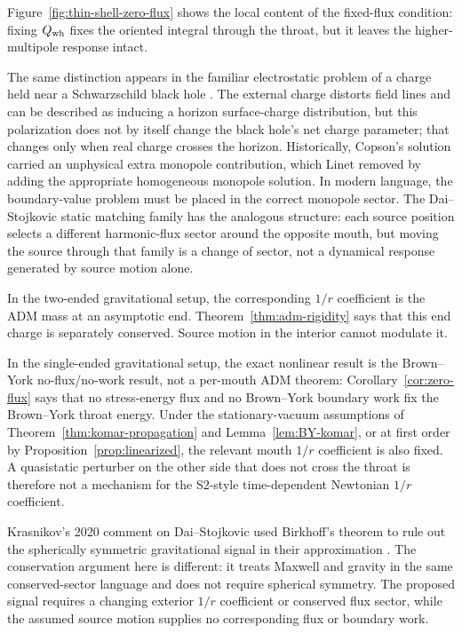 \documentclass[aps,prd,10pt,onecolumn,nofootinbib,superscriptaddress,floatfix]{revtex4-2}
\begin{document}
Figure~\ref{fig:thin-shell-zero-flux} shows the local content of the
fixed-flux condition: fixing $Q_{\rm wh}$ fixes the oriented integral through
the throat, but it leaves the higher-multipole response intact.

The same distinction appears in the familiar electrostatic problem of a charge
held near a Schwarzschild black hole
\cite{Copson1928Electrostatics,HanniRuffini1973Lines,
Linet1976Electrostatics,PoissonPoundVega2011Motion}.  The external charge
distorts field lines and can be described as inducing a horizon surface-charge
distribution, but this polarization does not by itself change the black hole's
net charge parameter; that changes only when real charge crosses the horizon.
Historically, Copson's solution carried an unphysical extra monopole
contribution, which Linet removed by adding the appropriate homogeneous
monopole solution.  In modern language, the boundary-value problem must be
placed in the correct monopole sector.  The Dai--Stojkovic static matching
family has the analogous structure: each source position selects a different
harmonic-flux sector around the opposite mouth, but moving the source through
that family is a change of sector, not a dynamical response generated by source
motion alone.

In the two-ended gravitational setup, the corresponding $1/r$ coefficient is
the ADM mass at an asymptotic end.  Theorem~\ref{thm:adm-rigidity} says that
this end charge is separately conserved.  Source motion in the interior
cannot modulate it.

In the single-ended gravitational setup, the exact nonlinear result is the
Brown--York no-flux/no-work result, not a per-mouth ADM theorem:
Corollary~\ref{cor:zero-flux} says that no stress-energy flux and no
Brown--York boundary work fix the Brown--York throat energy.  Under the
stationary-vacuum assumptions of Theorem~\ref{thm:komar-propagation} and
Lemma~\ref{lem:BY-komar}, or at first order by
Proposition~\ref{prop:linearized}, the relevant mouth $1/r$ coefficient is
also fixed.  A quasistatic perturber on the other side that does not cross the
throat is therefore not a mechanism for the S2-style time-dependent Newtonian $1/r$
coefficient.

Krasnikov's 2020 comment on Dai--Stojkovic used Birkhoff's theorem to rule out
the spherically symmetric gravitational signal in their approximation
\cite{Krasnikov2020CommentObserving}.  The conservation argument here is
different: it treats Maxwell and gravity in the same conserved-sector language
and does not require spherical symmetry.  The proposed signal requires a
changing exterior $1/r$ coefficient or conserved flux sector, while the assumed
source motion supplies no corresponding flux or boundary work.
\end{document}
